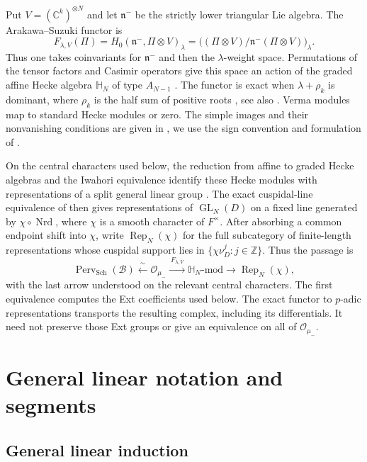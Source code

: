 \documentclass[10pt,a4paper]{article}
\theoremstyle{definition}
\theoremstyle{remark}
\numberwithin{equation}{section}
\newcommand{\ZZ}{\mathbb{Z}}
\newcommand{\CC}{\mathbb{C}}
\newcommand{\rep}{\operatorname{Rep}}
\DeclareMathOperator{\GL}{GL}
\begin{document}
Put $V=(\CC^k)^{\otimes N}$ and let $\mathfrak n^-$ be the strictly
lower triangular Lie algebra. The Arakawa--Suzuki functor
\cite{AS1998,Suzuki1998} is
\[
 F_{\lambda,V}(\Pi)
 =H_0(\mathfrak n^-,\Pi\otimes V)_\lambda
 =\bigl((\Pi\otimes V)/\mathfrak n^-(\Pi\otimes V)\bigr)_\lambda.
\]
Thus one takes coinvariants for $\mathfrak n^-$ and then the
$\lambda$-weight space. Permutations of the tensor factors and Casimir
operators give this space an action of the graded affine Hecke algebra
$\mathbb H_N$ of type $A_{N-1}$
\cite[equation~(4.1.2) and Lemma~4.2.2]{BC2015}.
The functor is exact when $\lambda+\rho_k$ is dominant, where
$\rho_k$ is the half sum of positive roots \cite{AS1998}, see also
\cite[Remark~4.1.1]{BC2015}. Verma modules map to standard Hecke
modules or zero. The simple images and their nonvanishing conditions
are given in \cite[Theorems~3.2.1--3.2.2]{Suzuki1998}, we use the
sign convention and formulation of \cite[Theorem~4.2.3]{BC2015}.

On the central characters used below, the reduction from affine to
graded Hecke algebras and the Iwahori equivalence identify these Hecke
modules with representations of a split general linear group
\cite[\S1 and \S4]{BC2015}. The exact cuspidal-line equivalence of
\cite[Theorem~3.8]{RegularLM2018} then gives representations of
$\GL_N(D)$ on a fixed line generated by $\chi\circ\operatorname{Nrd}$,
where $\chi$ is a smooth character of $F^\times$. After absorbing a common
endpoint shift into $\chi$, write $\rep_N(\chi)$ for the full subcategory
of finite-length representations whose cuspidal support lies in
$\{\chi\nu_D^j:j\in\ZZ\}$. Thus the passage is
\[
 \operatorname{Perv}_{\mathrm{Sch}}(\mathcal B)
 \xleftarrow{\ \sim\ }\mathcal O_{\mu_-}
 \xrightarrow{\ F_{\lambda,V}\ }\mathbb H_N\text{-}\mathrm{mod}
 \longrightarrow\rep_N(\chi),
\]
with the last arrow understood on the relevant central characters.
The first equivalence computes the Ext coefficients used below.
The exact functor to $p$-adic representations transports the resulting
complex, including its differentials. It need not preserve those Ext
groups or give an equivalence on all of $\mathcal O_{\mu_-}$.

\section{General linear notation and segments}
\subsection{General linear induction}
\end{document}
